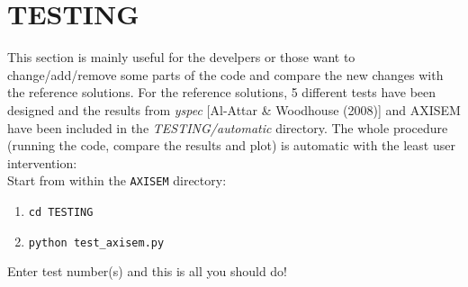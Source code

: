 \documentclass[11pt,letter,fleqn,english,notitlepage]{article}
\begin{document}




\newpage
\section{TESTING}

This section is mainly useful for the develpers or those want to change/add/remove some parts of the code and compare the new changes with the reference solutions.
For the reference solutions, 5 different tests have been designed and 
the results from \textit{yspec} [Al-Attar \& Woodhouse (2008)] and AXISEM have been included in the \textit{TESTING/automatic} directory.
The whole procedure (running the code, compare the results and plot) is automatic with the least user intervention: \\

Start from within the {\tt AXISEM} directory:
 \begin{enumerate}
 \itemsep0em
 \item {\tt cd TESTING}
 \item {\tt python test\_axisem.py}
 \end{enumerate}

Enter test number(s) and this is all you should do! \\
\end{document}
